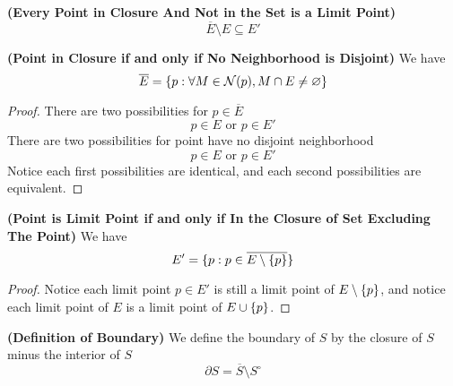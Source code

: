 \documentclass{report}
\begin{document}
\begin{corollary}
\label{2.2.8}
\textbf{(Every Point in Closure And Not in the Set is a Limit Point)}
\begin{equation}
\overline{E}\setminus E\subseteq E'
\end{equation}
\end{corollary}
\begin{theorem}
\label{2.2.9}
\textbf{(Point in Closure if and only if No Neighborhood is Disjoint)} We have
\begin{equation}
\overline{E}=\{ p: \forall M\in \mathcal{N}(p), M\cap E\neq \varnothing \}
\end{equation}
\end{theorem}
\begin{proof}
  There are two possibilities for $p\in \overline{E}$
  \begin{equation}
  p\in E\text{ or }p\in E'
  \end{equation}
  There are two possibilities for point have no disjoint neighborhood
  \begin{equation}
  p\in E\text{ or }p\in E'
  \end{equation}
  Notice each first possibilities are identical, and each second possibilities are equivalent.
\end{proof}
\begin{theorem}
\label{2.2.10}
\textbf{(Point is Limit Point if and only if In the Closure of Set Excluding The Point)} We have  
\begin{equation}
E'=\{ p:p \in \overline{E\setminus \{ p \}} \}
\end{equation}
\end{theorem}
\begin{proof}
  Notice each limit point $p\in  E'$ is still a limit point of $E\setminus \{ p \}$, and notice each limit point of  $E$ is a limit point of $E\cup \{ p \}$.
\end{proof}
\begin{definition}
\label{2.2.11}
\textbf{(Definition of Boundary)} We define the boundary of $S$ by the closure of $S$ minus the interior of  $S$
 \begin{equation*}
\partial S=\overline{S}\setminus S^\circ 
\end{equation*}
\end{definition}
\end{document}

